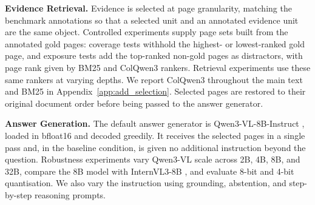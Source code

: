 \documentclass[11pt]{article}
\begin{document}
\textbf{Evidence Retrieval.}
Evidence is selected at page granularity, matching the benchmark annotations so that a selected unit and an annotated evidence unit are the same object. Controlled experiments supply page sets built from the annotated gold pages: coverage tests withhold the highest- or lowest-ranked gold page, and exposure tests add the top-ranked non-gold pages as distractors, with page rank given by BM25 and ColQwen3 rankers. Retrieval experiments use these same rankers at varying depths. We report ColQwen3 throughout the main text and BM25 in Appendix~\ref{app:add_selection}. Selected pages are restored to their original document order before being passed to the answer generator.

\textbf{Answer Generation.}
The default answer generator is Qwen3-VL-8B-Instruct \cite{bai2025qwen3vl}, loaded in bfloat16 and decoded greedily. It receives the selected pages in a single pass and, in the baseline condition, is given no additional instruction beyond the question. Robustness experiments vary Qwen3-VL scale across 2B, 4B, 8B, and 32B, compare the 8B model with InternVL3-8B \cite{zhu2025internvl3}, and evaluate 8-bit and 4-bit quantisation. We also vary the instruction using grounding, abstention, and step-by-step reasoning prompts. 

\end{document}
